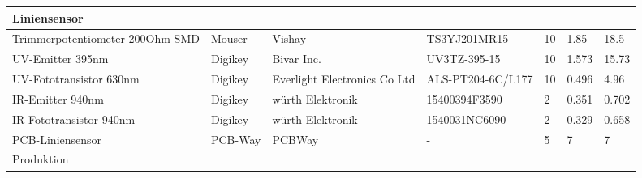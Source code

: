 \documentclass[main.tex]{subfiles} %
\begin{document}
\begin{table}[h]
{\begin{tabular}{|p{3cm}|p{2.5cm}|p{2.5cm}|p{3cm}|p{1cm}|p{1.5cm}|p{1cm}|}
        \rowcolor{lightgray} Liniensensor      &                        &                               &                                 &                     &                            &                                 \\ \hline
        Trimmerpotentiometer 200Ohm SMD        & Mouser                 & Vishay                        & TS3YJ201MR15                    & 10                  & 1.85                       & 18.5                           \\ \hline
        UV-Emitter 395nm                       & Digikey                & Bivar Inc.                    & UV3TZ-395-15                    & 10                  & 1.573                      & 15.73                           \\ \hline
        UV-Fototransistor 630nm                & Digikey                & Everlight Electronics Co Ltd  & ALS-PT204-6C/L177               & 10                  & 0.496                      & 4.96                           \\ \hline
        IR-Emitter 940nm                       & Digikey                & würth Elektronik              & 15400394F3590                   & 2                   & 0.351                      & 0.702                           \\ \hline
        IR-Fototransistor 940nm                & Digikey                & würth Elektronik              & 1540031NC6090                   & 2                   & 0.329                      & 0.658                           \\ \hline
        PCB-Liniensensor                       & PCB-Way                & PCBWay                        & -                               & 5                   & 7                          & 7                           \\ \hline
        \rowcolor{lightgray} Produktion        &                        &                               &                                 &                     &                            &                                 \\ \hline

\end{tabular}}
\end{table}
\end{document}
